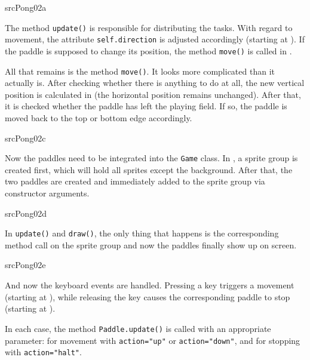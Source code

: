{srcPong02a}

The method \texttt{update()} is responsible for distributing the tasks. With regard to movement, the attribute \texttt{self.direction} is adjusted accordingly (starting at ). If the paddle is supposed to change its position, the method \texttt{move()} is called in .



All that remains is the method \texttt{move()}. It looks more complicated than it actually is. After checking whether there is anything to do at all, the new vertical position is calculated in  (the horizontal position remains unchanged). After that, it is checked whether the paddle has left the playing field. If so, the paddle is moved back to the top or bottom edge accordingly.

{srcPong02c}

Now the paddles need to be integrated into the \texttt{Game} class. In , a sprite group is created first, which will hold all sprites except the background. After that, the two paddles are created and immediately added to the sprite group via constructor arguments.

{srcPong02d}

In \texttt{update()} and \texttt{draw()}, the only thing that happens is the corresponding method call on the sprite group and now the paddles finally show up on screen.

{srcPong02e}

And now the keyboard events are handled. Pressing a key triggers a movement (starting at ), while releasing the key causes the corresponding paddle to stop (starting at ).

In each case, the method \texttt{Paddle.update()} is called with an appropriate parameter:  for movement with \verb+action="up"+ or \verb+action="down"+, and for stopping with \verb+action="halt"+.

